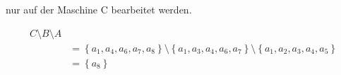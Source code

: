 nur auf der Maschine C bearbeitet werden.

\begin{align}
	 C \setminus B \setminus A \\
	& = \left\{ a_1, a_4, a_6, a_7, a_8 \right\} \setminus \left\{a_1,a_3,a_4,a_6, a_7\right\} \setminus \left\{  a_1, a_2,a_3,a_4,a_5\right\} \\
	& = \left\{a_8\right\}
\end{align}